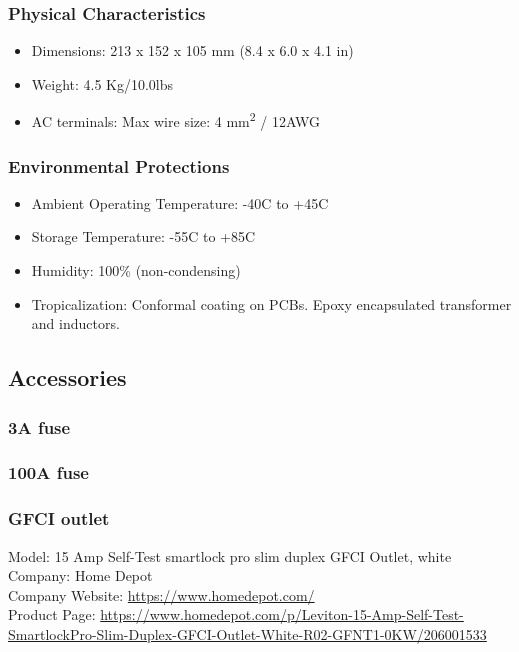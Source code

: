 \subsubsection{Physical Characteristics}
\begin{itemize}
	\item Dimensions: 213 x 152 x 105 mm (8.4 x 6.0 x 4.1 in)
	\item Weight: 4.5 Kg/10.0lbs
	\item AC terminals: Max wire size: 4 mm\textsuperscript{2} / 12AWG
\end{itemize}

\subsubsection{Environmental Protections}
\begin{itemize}
	\item Ambient Operating Temperature: -40\degree C to +45\degree C
	\item Storage Temperature: -55\degree C to +85\degree C
	\item Humidity: 100\% (non-condensing)
	\item Tropicalization: Conformal coating on PCBs. Epoxy encapsulated transformer and inductors.
\end{itemize}



\subsection{Accessories}

\subsubsection{3A fuse}
\subsubsection{100A fuse}
\subsubsection{GFCI outlet}
Model: 15 Amp Self-Test smartlock pro slim duplex GFCI Outlet, white \\
Company: Home Depot \\
Company Website: \href{https://www.homedepot.com/}{https://www.homedepot.com/} \\
Product Page: \href{https://www.homedepot.com/p/Leviton-15-Amp-Self-Test-SmartlockPro-Slim-Duplex-GFCI-Outlet-White-R02-GFNT1-0KW/206001533}{https://www.homedepot.com/p/Leviton-15-Amp-Self-Test-SmartlockPro-Slim-Duplex-GFCI-Outlet-White-R02-GFNT1-0KW/206001533} \\


